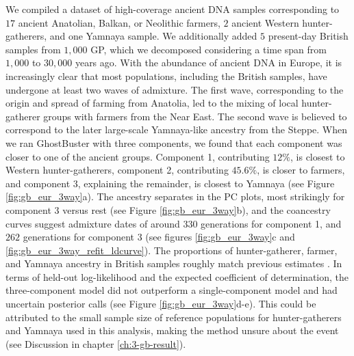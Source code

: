 We compiled a dataset of high-coverage ancient DNA samples corresponding to $17$ ancient Anatolian, Balkan, or Neolithic farmers, $2$ ancient Western hunter-gatherers, and one Yamnaya sample. We additionally added $5$ present-day British samples from $1{,}000$ GP, which we decomposed considering a time span from $1{,}000$ to $30{,}000$ years ago. With the abundance of ancient DNA in Europe, it is increasingly clear that most populations, including the British samples, have undergone at least two waves of admixture. The first wave, corresponding to the origin and spread of farming from Anatolia, led to the mixing of local hunter-gatherer groups with farmers from the Near East. The second wave is believed to correspond to the later large-scale Yamnaya-like ancestry from the Steppe. When we ran GhostBuster with three components, we found that each component was closer to one of the ancient groups. Component 1, contributing $12\%$, is closest to Western hunter-gatherers, component 2, contributing $45.6\%$, is closer to farmers, and component 3, explaining the remainder, is closest to Yamnaya (see Figure \ref{fig:gb_eur_3way}a). The ancestry separates in the PC plots, most strikingly for component 3 versus rest (see Figure \ref{fig:gb_eur_3way}b), and the coancestry curves suggest admixture dates of around $330$ generations for component 1, and $262$ generations for component 3 (see figures \ref{fig:gb_eur_3way}c and \ref{fig:gb_eur_3way_refit_ldcurve}). The proportions of hunter-gatherer, farmer, and Yamnaya ancestry in British samples roughly match previous estimates \cite{haak2015massive}. In terms of held-out log-likelihood and the expected coefficient of determination, the three-component model did not outperform a single-component model and had uncertain posterior calls (see Figure \ref{fig:gb_eur_3way}d-e). This could be attributed to the small sample size of reference populations for hunter-gatherers and Yamnaya used in this analysis, making the method unsure about the event (see Discussion in chapter \ref{ch:3-gb-result}).  


